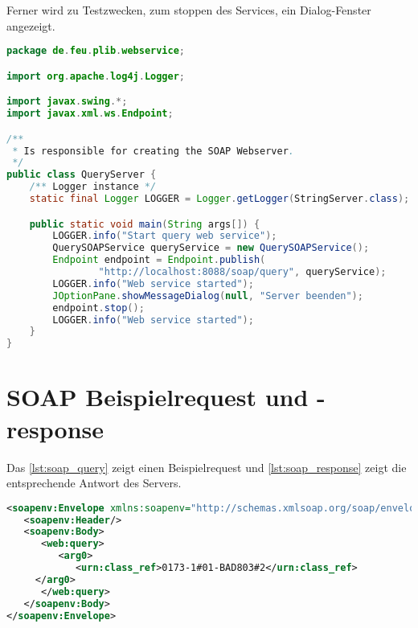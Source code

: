 Ferner wird zu Testzwecken, zum stoppen des Services, ein Dialog-Fenster angezeigt.
 
\begin{lstlisting}[caption=SOAP Webservice Server, language=Java, label=lst:soap_webservice_server]
package de.feu.plib.webservice;

import org.apache.log4j.Logger;

import javax.swing.*;
import javax.xml.ws.Endpoint;

/**
 * Is responsible for creating the SOAP Webserver.
 */
public class QueryServer {
    /** Logger instance */
    static final Logger LOGGER = Logger.getLogger(StringServer.class);

    public static void main(String args[]) {
        LOGGER.info("Start query web service");
        QuerySOAPService queryService = new QuerySOAPService();
        Endpoint endpoint = Endpoint.publish(
                "http://localhost:8088/soap/query", queryService);
        LOGGER.info("Web service started");
        JOptionPane.showMessageDialog(null, "Server beenden");
        endpoint.stop();
        LOGGER.info("Web service started");
    }
}
 \end{lstlisting}   

\section{SOAP Beispielrequest und -response}

Das \autoref{lst:soap_query} zeigt einen Beispielrequest und \autoref{lst:soap_response} zeigt die entsprechende Antwort des Servers. 

\begin{lstlisting}[caption=Beispielanfrage SOAP Webservice query, language=XML, label=lst:soap_query]
 <soapenv:Envelope xmlns:soapenv="http://schemas.xmlsoap.org/soap/envelope/" xmlns:web="http://webservice.plib.feu.de/" xmlns:urn="urn:iso:std:iso:ts:29002:-31:ed-1:tech:xml-schema:query" xmlns:urn1="urn:iso:std:iso:ts:29002:-10:ed-1:tech:xml-schema:catalogue" xmlns:urn2="urn:iso:std:iso:ts:29002:-4:ed-1:tech:xml-schema:basic" xmlns:urn3="urn:iso:std:iso:ts:29002:-10:ed-1:tech:xml-schema:value">
   <soapenv:Header/>
   <soapenv:Body>
      <web:query>
         <arg0>
            <urn:class_ref>0173-1#01-BAD803#2</urn:class_ref>
	 </arg0>
      </web:query>
   </soapenv:Body>
</soapenv:Envelope>    
 \end{lstlisting}  



